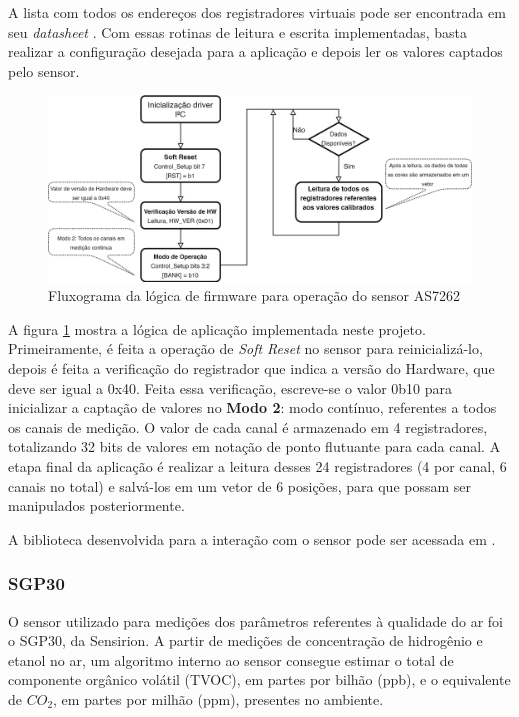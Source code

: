 \documentclass[../monografia.tex]{subfiles}
\begin{document}
A lista com todos os endereços dos registradores virtuais pode ser encontrada em seu \textit{datasheet} \cite{as7262}. Com essas rotinas de leitura e escrita implementadas, basta realizar a configuração desejada para a aplicação e depois ler os valores captados pelo sensor. 

\begin{figure}[h]
	\centering
	\includegraphics[scale=0.2]{as7262_firmware.png}
	\caption{Fluxograma da lógica de firmware para operação do sensor AS7262}
	\label{fig:as7262_firmware}
\end{figure}

A figura \ref{fig:as7262_firmware} mostra a lógica de aplicação implementada neste projeto. Primeiramente, é feita a operação de \textit{Soft Reset} no sensor para reinicializá-lo, depois é feita a verificação do registrador que indica a versão do Hardware, que deve ser igual a 0x40. Feita essa verificação, escreve-se o valor 0b10 para inicializar a captação de valores no \textbf{Modo 2}: modo contínuo, referentes a todos os canais de medição. O valor de cada canal é armazenado em 4 registradores, totalizando 32 bits de valores em notação de ponto flutuante para cada canal. A etapa final da aplicação é realizar a leitura desses 24 registradores (4 por canal, 6 canais no total) e salvá-los em um vetor de 6 posições, para que possam ser manipulados posteriormente.

A biblioteca desenvolvida para a interação com o sensor pode ser acessada em \cite{as7262-lib}.



\subsubsection{SGP30}

O sensor utilizado para medições dos parâmetros referentes à qualidade do ar foi o SGP30, da Sensirion. A partir de medições de concentração de hidrogênio e etanol no ar, um algoritmo interno ao sensor consegue estimar o total de componente orgânico volátil (TVOC), em partes por bilhão (ppb), e o equivalente de $CO_{2}$, em partes por milhão (ppm), presentes no ambiente. 
\end{document}
